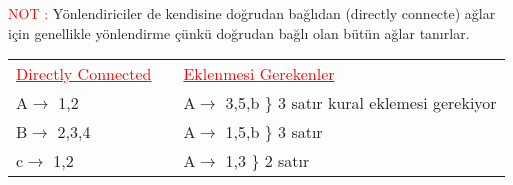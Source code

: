 \textcolor{red}{NOT : } Yönlendiriciler de kendisine doğrudan bağlıdan (directly connecte) ağlar için genellikle yönlendirme  çünkü doğrudan bağlı olan bütün ağlar tanırlar.

\begin{table}[h]
   \centering
   \begin{tabular}{lll}
   \textcolor{red}{\underline{Directly Connected}}&   
   & \textcolor{red}{\underline{Eklenmesi Gerekenler}}\\
   A$\rightarrow$ 1,2 && A$\rightarrow$ 3,5,b \} 3 satır kural eklemesi gerekiyor\\
   B$\rightarrow$ 2,3,4 && A$\rightarrow$ 1,5,b \} 3 satır\\
   c$\rightarrow$ 1,2 &&A$\rightarrow$ 1,3 \} 2 satır \\
  \end{tabular}
\end{table}
